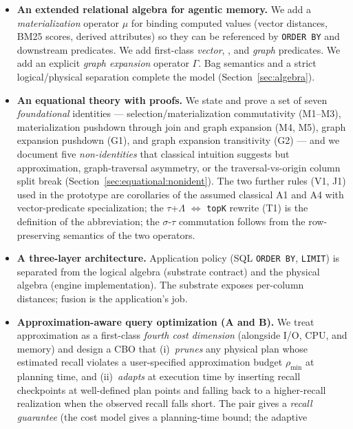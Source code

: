 \documentclass[sigconf,nonacm,review]{acmart}
\theoremstyle{plain}
\theoremstyle{definition}
\theoremstyle{remark}
\begin{document}
\begin{itemize}[leftmargin=*]
  \item \textbf{An extended relational algebra for agentic memory.}
    We add a \emph{materialization} operator $\mu$ for binding
    computed values (vector distances, BM25 scores, derived attributes)
    so they can be referenced by \texttt{ORDER BY} and downstream
    predicates. We add first-class \emph{vector}, , and
    \emph{graph} predicates. We add an explicit \emph{graph expansion}
    operator $\Gamma$. Bag semantics and a strict logical/physical
    separation complete the model (Section~\ref{sec:algebra}).
  \item \textbf{An equational theory with proofs.} We state and prove a
    set of seven \emph{foundational} identities --- selection/materialization
    commutativity (M1--M3), materialization pushdown through join and graph
    expansion (M4, M5), graph expansion pushdown (G1), and graph
    expansion transitivity (G2) --- and we document five
    \emph{non-identities} that classical intuition suggests but
    approximation, graph-traversal asymmetry, or the
    traversal-vs-origin column split break
    (Section~\ref{sec:equational:nonident}). The two further rules
    (V1, J1) used in the prototype are corollaries of the assumed
    classical A1 and A4 with vector-predicate specialization; the
    $\tau$+$\Lambda$ $\Leftrightarrow$ \texttt{topK} rewrite (T1)
    is the definition of the abbreviation; the $\sigma$-$\tau$
    commutation follows from the row-preserving semantics of the
    two operators.
  \item \textbf{A three-layer architecture.} Application policy (SQL
    \texttt{ORDER BY}, \texttt{LIMIT}) is separated from the logical
    algebra (substrate contract) and the physical algebra (engine
    implementation). The substrate exposes per-column distances;
    fusion is the application's job.
  \item \textbf{Approximation-aware query optimization (A and B).}
    We treat approximation as a first-class \emph{fourth cost
    dimension} (alongside I/O, CPU, and memory) and design a CBO
    that (i)~\emph{prunes} any physical plan whose estimated recall
    violates a user-specified approximation budget $\rho_{\min}$ at
    planning time, and (ii)~\emph{adapts} at execution time by
    inserting recall checkpoints at well-defined plan points and
    falling back to a higher-recall realization when the observed
    recall falls short. The pair gives a \emph{recall guarantee}
    (the cost model gives a planning-time bound; the adaptive

\end{itemize}
\end{document}
